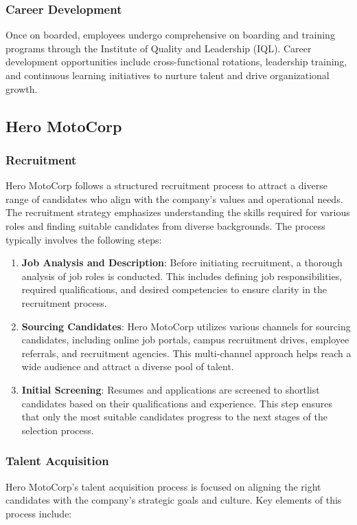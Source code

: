 \subsubsection{Career Development}
Once on boarded, employees undergo comprehensive on boarding and training programs through the Institute of Quality and Leadership (IQL). Career development opportunities include cross-functional rotations, leadership training, and continuous learning initiatives to nurture talent and drive organizational growth.

\subsection{Hero MotoCorp}
\subsubsection{Recruitment}
Hero MotoCorp follows a structured recruitment process to attract a diverse range of candidates who align with the company's values and operational needs. The recruitment strategy emphasizes understanding the skills required for various roles and finding suitable candidates from diverse backgrounds. The process typically involves the following steps:

\begin{enumerate}
	\item \textbf{Job Analysis and Description}: Before initiating recruitment, a thorough analysis of job roles is conducted. This includes defining job responsibilities, required qualifications, and desired competencies to ensure clarity in the recruitment process.
	
	\item \textbf{Sourcing Candidates}: Hero MotoCorp utilizes various channels for sourcing candidates, including online job portals, campus recruitment drives, employee referrals, and recruitment agencies. This multi-channel approach helps reach a wide audience and attract a diverse pool of talent.
	
	\item \textbf{Initial Screening}: Resumes and applications are screened to shortlist candidates based on their qualifications and experience. This step ensures that only the most suitable candidates progress to the next stages of the selection process.
\end{enumerate}


\subsubsection{Talent Acquisition}
Hero MotoCorp’s talent acquisition process is focused on aligning the right candidates with the company’s strategic goals and culture. Key elements of this process include:

